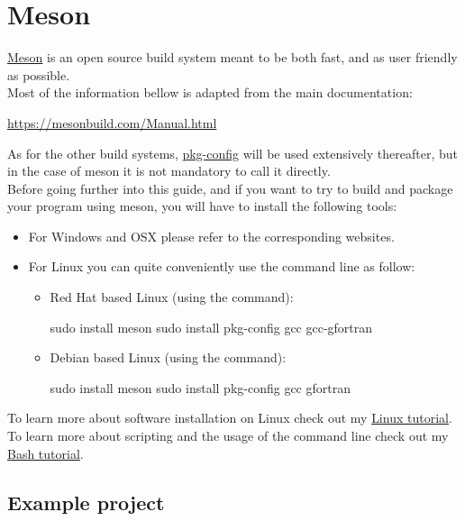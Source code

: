 \section{Meson}
\href{https://mesonbuild.com}{Meson} is an open source build system meant to be both fast, and as user friendly as possible. \\
Most of the information bellow is adapted from the main documentation:
\begin{center}\href{https://mesonbuild.com/Manual.html}{https://mesonbuild.com/Manual.html}\end{center}
As for the other build systems, \href{https://en.wikipedia.org/wiki/Pkg-config}{pkg-config} will be used extensively thereafter, but in the case of meson it is not mandatory to call it directly. \\
Before going further into this guide, and if you want to try to build and package your program using meson, you will have to install the following tools: 
\begin{itemize}
\item For Windows and OSX please refer to the corresponding websites.
\item For Linux you can quite conveniently use the command line as follow:
\begin{itemize}
\item Red Hat based Linux (using the  command):
\begin{scriptii}
\fprompt{~} sudo  install meson
\fprompt{~} sudo  install pkg-config gcc gcc-gfortran
\end{scriptii}
\item Debian based Linux (using the  command):
\begin{scriptii}
\uprompt{~} sudo  install meson
\uprompt{~} sudo  install pkg-config gcc gfortran
\end{scriptii}
\end{itemize}
\end{itemize}
To learn more about software installation on Linux check out my \href{https://www.ipcms.fr/wp-content/uploads/2021/11/linux.pdf}{Linux tutorial}. \\
To learn more about scripting and the usage of the command line check out my \href{https://www.ipcms.fr/wp-content/uploads/2021/05/bash.pdf}{Bash tutorial}. 

\subsection{Example project}


